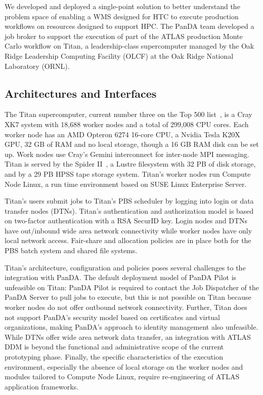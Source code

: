 We developed and deployed a single-point solution to better understand the
problem space of enabling a WMS designed for HTC to execute production
workflows on resources designed to support HPC. The PanDA team developed a
job broker to support the execution of part of the ATLAS production Monte
Carlo workflow on Titan, a leadership-class supercomputer managed by the Oak
Ridge Leadership Computing Facility (OLCF) at the Oak Ridge National
Laboratory (ORNL).


\subsection{Architectures and Interfaces}
\label{ssec:panda-titan}

The Titan supercomputer, current number three on the Top 500
list~\cite{top500}, is a Cray XK7 system with 18,688 worker nodes and a total
of 299,008 CPU cores. Each worker node has an AMD Opteron  6274 16-core CPU,
a Nvidia Tesla K20X GPU, 32 GB of RAM and no local storage, though a 16 GB
RAM disk can be set up. Work nodes use Cray’s Gemini interconnect for
inter-node MPI messaging. Titan is served by the Spider
II~\cite{oral2013olcf}, a Lustre filesystem with 32 PB of disk storage, and
by a 29 PB HPSS tape storage system. Titan’s worker nodes run Compute Node
Linux, a run time environment based on SUSE Linux Enterprise Server.

Titan's users submit jobs to Titan's PBS scheduler by logging into login or
data transfer nodes (DTNs). Titan's authentication and authorization model is
based on two-factor authentication with a RSA SecurID key. Login nodes and
DTNs have out/inbound wide area network connectivity while worker nodes have
only local network access. Fair-share and allocation policies are in place
both for the PBS batch system and shared file systems.

Titan's architecture, configuration and policies poses several challenges to
the integration with PanDA. The default deployment model of PanDA Pilot is
unfeasible on Titan: PanDA Pilot is required to contact the Job Dispatcher of
the PanDA Server to pull jobs to execute, but this is not possible on Titan
because worker nodes do not offer outbound network connectivity. Further,
Titan does not support PanDA's security model based on certificates and
virtual organizations, making PanDA's approach to identity management also
unfeasible. While DTNs offer wide area network data transfer, an integration
with ATLAS DDM is beyond the functional and administrative scope of the
current prototyping phase. Finally, the specific characteristics of the
execution environment, especially the absence of local storage on the worker
nodes and modules tailored to Compute Node Linux, require re-engineering of
ATLAS application frameworks.


